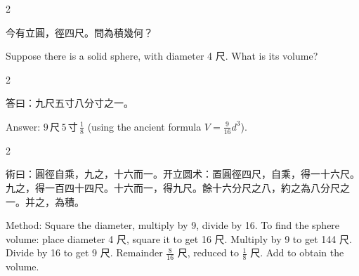 \documentclass[10pt,a4paper]{article}
\begin{document}
\vspace{0.2cm}

\begin{paracol}{2}

\begin{leftcolumn*}
\begin{problembi}[\textbf{問} · 立圓]
今有立圓，徑四尺。問為積幾何？
\end{problembi}
\end{leftcolumn*}

\begin{rightcolumn*}
\begin{problembi}
Suppose there is a solid sphere, with diameter 4 尺. What is its volume?
\end{problembi}
\end{rightcolumn*}

\end{paracol}

\begin{paracol}{2}

\begin{leftcolumn*}
\begin{answerbi}[\textbf{答}]
答曰：九尺五寸八分寸之一。
\end{answerbi}
\end{leftcolumn*}

\begin{rightcolumn*}
\begin{answerbi}
Answer: $9\,\text{尺}\,5\,\text{寸}\,\frac{1}{8}$ (using the ancient formula $V = \frac{9}{16}d^3$).
\end{answerbi}
\end{rightcolumn*}

\end{paracol}

\begin{paracol}{2}

\begin{leftcolumn*}
\begin{methodbi}[\textbf{術}]
術曰：圓徑自乘，九之，十六而一。开立圆术：置圓徑四尺，自乘，得一十六尺。九之，得一百四十四尺。十六而一，得九尺。餘十六分尺之八，約之為八分尺之一。并之，為積。
\end{methodbi}
\end{leftcolumn*}

\begin{rightcolumn*}
\begin{methodbi}
Method: Square the diameter, multiply by 9, divide by 16. To find the sphere volume: place diameter 4 尺, square it to get 16 尺. Multiply by 9 to get 144 尺. Divide by 16 to get 9 尺. Remainder $\frac{8}{16}$ 尺, reduced to $\frac{1}{8}$ 尺. Add to obtain the volume.
\end{methodbi}
\end{rightcolumn*}

\end{paracol}
\end{document}
